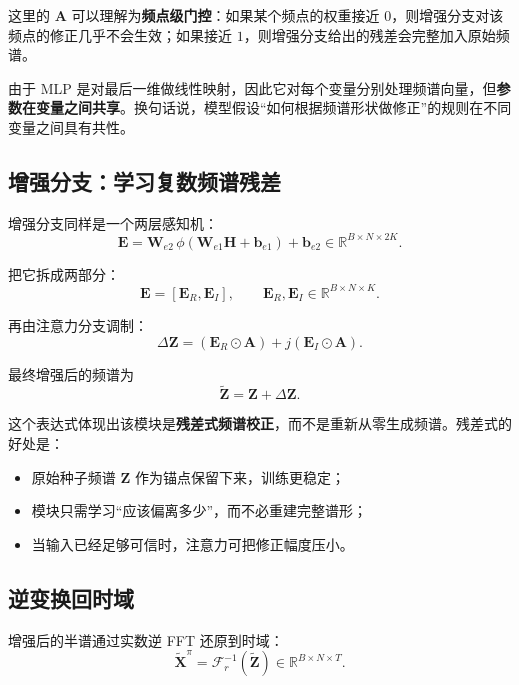 \documentclass[UTF8]{ctexart}
\begin{document}
这里的 \(\bm{A}\) 可以理解为\textbf{频点级门控}：如果某个频点的权重接近 \(0\)，则增强分支对该频点的修正几乎不会生效；如果接近 \(1\)，则增强分支给出的残差会完整加入原始频谱。

由于 MLP 是对最后一维做线性映射，因此它对每个变量分别处理频谱向量，但\textbf{参数在变量之间共享}。换句话说，模型假设“如何根据频谱形状做修正”的规则在不同变量之间具有共性。

\subsection{增强分支：学习复数频谱残差}

增强分支同样是一个两层感知机：
\begin{equation}
    \bm{E} = \bm{W}_{e2}\,\phi(\bm{W}_{e1}\bm{H}+\bm{b}_{e1})+\bm{b}_{e2}
    \in \mathbb{R}^{B \times N \times 2K}.
\end{equation}

把它拆成两部分：
\begin{equation}
    \bm{E} = [\bm{E}_R,\bm{E}_I],
    \qquad
    \bm{E}_R,\bm{E}_I \in \mathbb{R}^{B \times N \times K}.
\end{equation}

再由注意力分支调制：
\begin{equation}
    \Delta \bm{Z}
    = (\bm{E}_R \odot \bm{A}) + j(\bm{E}_I \odot \bm{A}).
\end{equation}

最终增强后的频谱为
\begin{equation}
    \widetilde{\bm{Z}} = \bm{Z} + \Delta \bm{Z}.
\end{equation}

这个表达式体现出该模块是\textbf{残差式频谱校正}，而不是重新从零生成频谱。残差式的好处是：
\begin{itemize}
    \item 原始种子频谱 \(\bm{Z}\) 作为锚点保留下来，训练更稳定；
    \item 模块只需学习“应该偏离多少”，而不必重建完整谱形；
    \item 当输入已经足够可信时，注意力可把修正幅度压小。
\end{itemize}

\subsection{逆变换回时域}

增强后的半谱通过实数逆 FFT 还原到时域：
\begin{equation}
    \widetilde{\bm{X}}^{\pi}
    = \mathcal{F}_r^{-1}(\widetilde{\bm{Z}})
    \in \mathbb{R}^{B \times N \times T}.
\end{equation}
\end{document}
